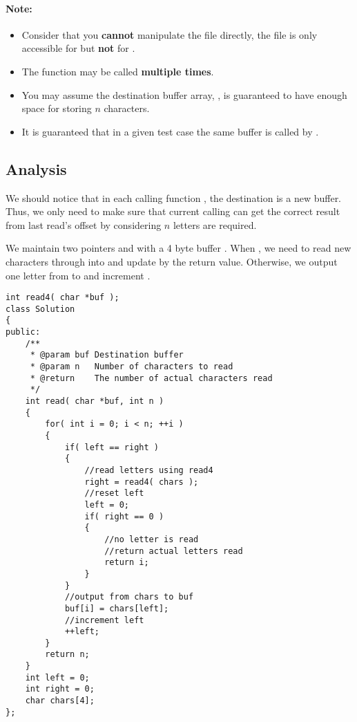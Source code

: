  

\paragraph{Note:}

\begin{itemize}
\item Consider that you \textbf{cannot} manipulate the file directly, the file is only accessible for  but \textbf{not} for .
\item The  function may be called \textbf{multiple times}.
\item You may assume the destination buffer array, , is guaranteed to have enough space for storing $n$ characters.
\item It is guaranteed that in a given test case the same buffer  is called by .
\end{itemize}
\subsection{Analysis}

We should notice that in each calling function , the destination  is a new buffer. Thus, we only need to make sure that current calling  can get the correct result from last read's offset by considering $n$ letters are required.

We maintain two pointers  and  with a 4 byte buffer . When , we need to read new characters through  into  and update  by the return value. Otherwise, we output one letter from  to  and increment .

\setcounter{lstlisting}{0}
\begin{lstlisting}[style=customc, caption={Two Pointers}]
int read4( char *buf );
class Solution
{
public:
    /**
     * @param buf Destination buffer
     * @param n   Number of characters to read
     * @return    The number of actual characters read
     */
    int read( char *buf, int n )
    {
        for( int i = 0; i < n; ++i )
        {
            if( left == right )
            {
                //read letters using read4
                right = read4( chars );
                //reset left
                left = 0;
                if( right == 0 )
                {
                    //no letter is read
                    //return actual letters read
                    return i;
                }
            }
            //output from chars to buf
            buf[i] = chars[left];
            //increment left
            ++left;
        }
        return n;
    }
    int left = 0;
    int right = 0;
    char chars[4];
};
\end{lstlisting}